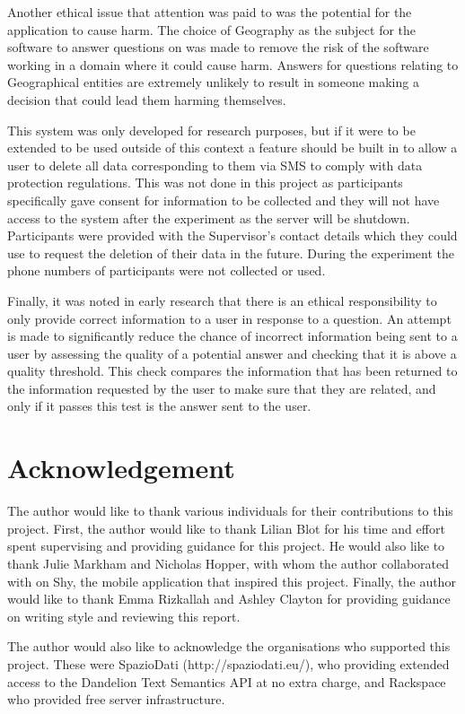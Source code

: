 \documentclass[authoryearcitations]{UoYCSproject}
\begin{document}
Another ethical issue that attention was paid to was the potential for the application to cause harm. The choice of Geography as the subject for the software to answer questions on was made to remove the risk of the software working in a domain where it could cause harm. Answers for questions relating to Geographical entities are extremely unlikely to result in someone making a decision that could lead them harming themselves.

This system was only developed for research purposes, but if it were to be extended to be used outside of this context a feature should be built in to allow a user to delete all data corresponding to them via SMS to comply with data protection regulations. This was not done in this project as participants specifically gave consent for information to be collected and they will not have access to the system after the experiment as the server will be shutdown. Participants were provided with the Supervisor's contact details which they could use to request the deletion of their data in the future. During the experiment the phone numbers of participants were not collected or used.

Finally, it was noted in early research that there is an ethical responsibility to only provide correct information to a user in response to a question. An attempt is made to significantly reduce the chance of incorrect information being sent to a user by assessing the quality of a potential answer and checking that it is above a quality threshold. This check compares the information that has been returned to the information requested by the user to make sure that they are related, and only if it passes this test is the answer sent to the user.

\newpage
\chapter*{Acknowledgement}
The author would like to thank various individuals for their contributions to this project. First, the author would like to thank Lilian Blot for his time and effort spent supervising and providing guidance for this project. He would also like to thank Julie Markham and Nicholas Hopper, with whom the author collaborated with on Shy, the mobile application that inspired this project. Finally, the author would like to thank Emma Rizkallah and Ashley Clayton for providing guidance on writing style and reviewing this report.

The author would also like to acknowledge the organisations who supported this project. These were SpazioDati (http://spaziodati.eu/), who providing extended access to the Dandelion Text Semantics API at no extra charge, and Rackspace who provided free server infrastructure.
\end{document}
